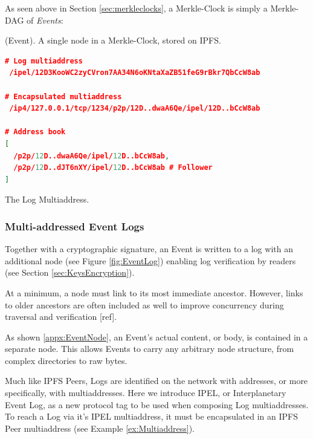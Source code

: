 \documentclass{textile}
\begin{document}
As seen above in Section \ref{sec:merkleclocks}, a Merkle-Clock is simply a Merkle-DAG of \emph{Events}:

\begin{definition}
 (Event). A single node in a Merkle-Clock, stored on IPFS.
\end{definition}

\FloatBarrier

\begin{example*}[!b]
\centering
\begin{minipage}{0.7\textwidth}
\begin{lstlisting}[language=json,firstnumber=1]
# Log multiaddress
 /ipel/12D3KooWC2zyCVron7AA34N6oKNtaXaZB51feG9rBkr7QbCcW8ab

# Encapsulated multiaddress
 /ip4/127.0.0.1/tcp/1234/p2p/12D..dwaA6Qe/ipel/12D..bCcW8ab

# Address book
[
  /p2p/12D..dwaA6Qe/ipel/12D..bCcW8ab,
  /p2p/12D..dJT6nXY/ipel/12D..bCcW8ab # Follower
]
\end{lstlisting}
\end{minipage}
  \caption{The Log Multiaddress.}
  \label{ex:Multiaddress}
\end{example*}

\subsubsection{Multi-addressed Event Logs}

Together with a cryptographic signature, an Event is written to a log with an additional node (see Figure \ref{fig:EventLog}) enabling log verification by readers (see Section  \ref{sec:KeysEncryption}).

At a minimum, a node must link to its most immediate ancestor. However, links to older ancestors are often included as well to improve concurrency during traversal and verification [ref]. 

As shown \ref{appx:EventNode}, an Event's actual content, or body, is contained in a separate node. This allows Events to carry any arbitrary node structure, from complex directories to raw bytes.

Much like IPFS Peers, Logs are identified on the network with addresses, or more specifically, with multiaddresses\cite{Multiaddr}. Here we introduce IPEL, or Interplanetary Event Log, as a new protocol tag to be used when composing Log multiaddresses. To reach a Log via it's IPEL multiaddress, it must be encapsulated in an IPFS Peer multiaddress (see Example \ref{ex:Multiaddress}).
\end{document}
